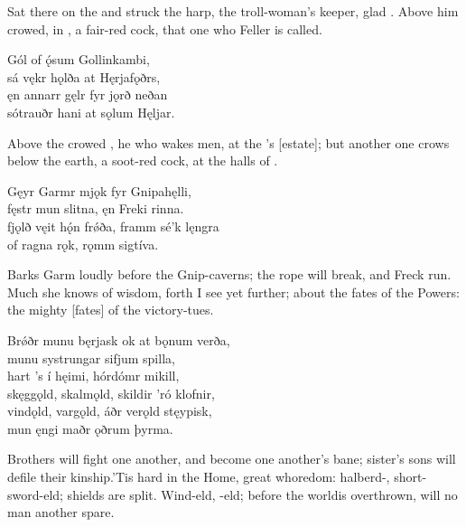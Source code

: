 \bvb Sat there on the  and struck the harp, the troll-woman’s keeper, glad . Above him crowed, in , a fair-red cock, that one who Feller is called.\evb

\bva Gól of ǫ́sum \hld Gollinkambi, \\%
sá vękr hǫlða \hld at Hęrjafǫðrs, \\%
ęn annarr gęlr \hld fyr jǫrð neðan \\%
sótrauðr hani \hld at sǫlum Hęljar.\eva

\bvb Above the  crowed , he who wakes men, at the ’s [estate]; but another one crows below the earth, a soot-red cock, at the halls of .\footnotemark[1]\evb
{}

\bva Gęyr Garmr mjǫk \hld fyr Gnipahęlli, \\%
fęstr mun slitna, \hld ęn Freki rinna. \\%
fjǫlð vęit hǫ́n frǿða, \hld framm sé’k lęngra \\%
of ragna rǫk, \hld rǫmm sigtíva.\eva

\bvb Barks Garm loudly before the Gnip-caverns; the rope will break, and Freck run. Much she knows of wisdom, forth I see yet further; about the fates of the Powers: the mighty [fates] of the victory-tues.\evb

\bva Brǿðr munu bęrjask \hld ok at bǫnum verða, \\%
munu systrungar \hld sifjum spilla, \\%
hart ’s í hęimi, \hld hórdómr mikill, \\%
skęggǫld, skalmǫld, \hld skildir ’ró klofnir, \\%
vindǫld, vargǫld, \hld áðr verǫld stęypisk, \\%
mun ęngi maðr \hld ǫðrum þyrma.\eva

\bvb Brothers will fight one another, and become one another’s bane; sister’s sons will defile their kinship.\footnotemark[1] ’Tis hard in the Home, great whoredom: halberd-, short-sword-eld; shields are split. Wind-eld, -eld; before the world\footnotemark[2] is overthrown, will no man another spare.\evb
{}


